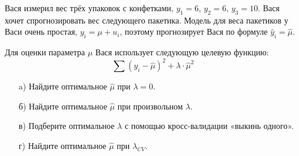\documentclass[12pt, a4paper, oneside]{article}
\begin{document}
Вася измерил вес трёх упаковок с конфетками,  $y_1=6$, $y_2=6$, $y_3=10$.  Вася хочет спрогнозировать вес следующего пакетика. Модель для веса пакетиков у Васи очень простая, $y_i = \mu + u_i$, поэтому прогнозирует Вася по формуле $\hat y_i = \hat \mu$.

Для оценки параметра $\mu$ Вася использует следующую целевую функцию:
\[
\sum (y_i - \hat \mu)^2 + \lambda \cdot \hat \mu^2
\]

\begin{enumerate}
	\item[a)] Найдите оптимальное $\hat\mu$ при $\lambda =0$.
	\item[б)] Найдите оптимальное $\hat\mu$ при произвольном $\lambda$.
	\item[в)] Подберите оптимальное $\lambda$ с помощью кросс-валидации «выкинь одного».
	\item[г)] Найдите оптимальное $\hat\mu$ при $\lambda_{CV}$.
\end{enumerate}
\end{document}

